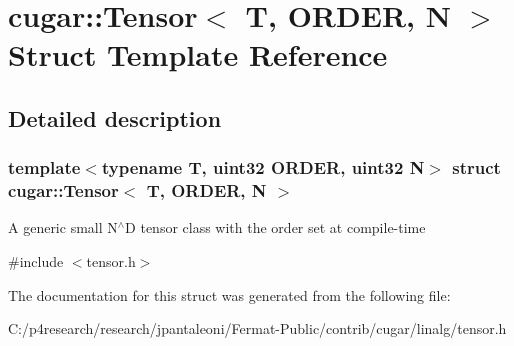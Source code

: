\hypertarget{structcugar_1_1_tensor}{}\section{cugar\+:\+:Tensor$<$ T, O\+R\+D\+ER, N $>$ Struct Template Reference}
\label{structcugar_1_1_tensor}


\subsection{Detailed description}
\subsubsection*{template$<$typename T, uint32 O\+R\+D\+ER, uint32 N$>$\newline
struct cugar\+::\+Tensor$<$ T, O\+R\+D\+E\+R, N $>$}

A generic small N$^\wedge$D tensor class with the order set at compile-\/time 

{\ttfamily \#include $<$tensor.\+h$>$}



The documentation for this struct was generated from the following file\+:\begin{DoxyCompactItemize}
\item 
C\+:/p4research/research/jpantaleoni/\+Fermat-\/\+Public/contrib/cugar/linalg/tensor.\+h\end{DoxyCompactItemize}
